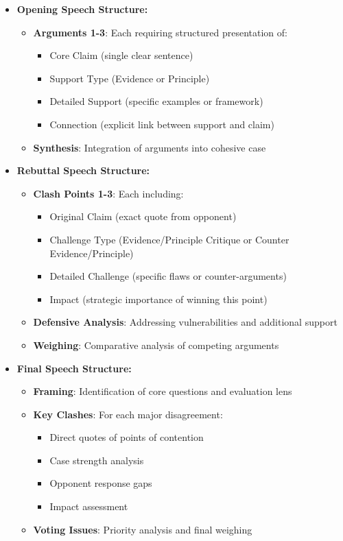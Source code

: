 \documentclass{article}
\begin{document}
\begin{itemize}
 \item \textbf{Opening Speech Structure:}
 \begin{itemize}
   \item \textbf{Arguments 1-3}: Each requiring structured presentation of:
   \begin{itemize}
     \item Core Claim (single clear sentence)
     \item Support Type (Evidence or Principle)
     \item Detailed Support (specific examples or framework)
     \item Connection (explicit link between support and claim)
   \end{itemize}
   \item \textbf{Synthesis}: Integration of arguments into cohesive case
 \end{itemize}

 \item \textbf{Rebuttal Speech Structure:}
 \begin{itemize}
   \item \textbf{Clash Points 1-3}: Each including:
   \begin{itemize}
     \item Original Claim (exact quote from opponent)
     \item Challenge Type (Evidence/Principle Critique or Counter Evidence/Principle)
     \item Detailed Challenge (specific flaws or counter-arguments)
     \item Impact (strategic importance of winning this point)
   \end{itemize}
   \item \textbf{Defensive Analysis}: Addressing vulnerabilities and additional support
   \item \textbf{Weighing}: Comparative analysis of competing arguments
 \end{itemize}

 \item \textbf{Final Speech Structure:}
 \begin{itemize}
   \item \textbf{Framing}: Identification of core questions and evaluation lens
   \item \textbf{Key Clashes}: For each major disagreement:
   \begin{itemize}
     \item Direct quotes of points of contention
     \item Case strength analysis
     \item Opponent response gaps
     \item Impact assessment
   \end{itemize}
   \item \textbf{Voting Issues}: Priority analysis and final weighing
 \end{itemize}


\end{itemize}
\end{document}
